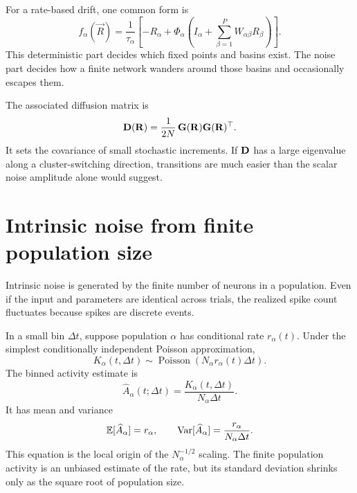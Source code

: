 For a rate-based drift, one common form is
%
\begin{equation}
  f_\alpha(\vec R)
  =
  \frac{1}{\tau_\alpha}
  \left[
    -R_\alpha
    +
    \Phi_\alpha\!\left(
      I_\alpha
      +
      \sum_{\beta=1}^P W_{\alpha\beta}R_\beta
    \right)
  \right].
  \label{eq:stochastic-rate-drift}
\end{equation}
%
This deterministic part decides which fixed points and basins exist. The noise part decides how a finite network wanders around those basins and occasionally escapes them.

The associated diffusion matrix is
%
\begin{equation}
  \mathbf{D}(\mathbf{R})
  =
  \frac{1}{2N}\,
  \mathbf{G}(\mathbf{R})\mathbf{G}(\mathbf{R})^\top .
  \label{eq:ch09-diffusion-matrix}
\end{equation}
%
It sets the covariance of small stochastic increments. If $\mathbf{D}$ has a large eigenvalue along a cluster-switching direction, transitions are much easier than the scalar noise amplitude alone would suggest.

\section{Intrinsic noise from finite population size}
\label{sec:intrinsic-noise-finite-population-size}

Intrinsic noise is generated by the finite number of neurons in a population. Even if the input and parameters are identical across trials, the realized spike count fluctuates because spikes are discrete events.

In a small bin $\Delta t$, suppose population $\alpha$ has conditional rate $r_\alpha(t)$. Under the simplest conditionally independent Poisson approximation,
%
\begin{equation}
  K_\alpha(t,\Delta t)
  \sim
  \operatorname{Poisson}\!\left(N_\alpha r_\alpha(t)\Delta t\right).
  \label{eq:population-count-poisson}
\end{equation}
%
The binned activity estimate is
%
\begin{equation}
  \widehat A_\alpha(t;\Delta t)
  =
  \frac{K_\alpha(t,\Delta t)}{N_\alpha\Delta t}.
  \label{eq:stochastic-binned-activity}
\end{equation}
%
It has mean and variance
%
\begin{equation}
  \mathbb{E}[\widehat A_\alpha]
  =
  r_\alpha,
  \qquad
  \operatorname{Var}[\widehat A_\alpha]
  =
  \frac{r_\alpha}{N_\alpha\Delta t}.
  \label{eq:intrinsic-noise-variance}
\end{equation}
%
This equation is the local origin of the $N_\alpha^{-1/2}$ scaling. The finite population activity is an unbiased estimate of the rate, but its standard deviation shrinks only as the square root of population size.

